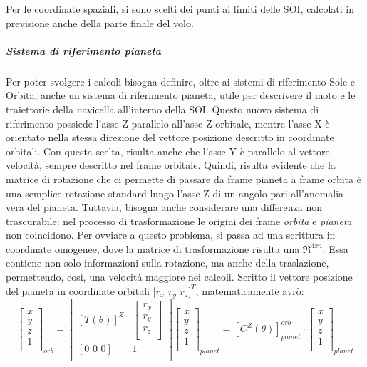\documentclass[a4paper]{article}
\begin{document}
Per le coordinate spaziali, si sono scelti dei punti ai limiti delle SOI, calcolati in previsione anche della parte finale del volo.
\newpage
\subparagraph{Sistema di riferimento pianeta\newline} Per poter svolgere i calcoli bisogna definire, oltre ai sistemi di riferimento Sole e Orbita, anche un sistema di riferimento pianeta, utile per descrivere il moto e le traiettorie della navicella all'interno della SOI. \newline Questo nuovo sistema di riferimento possiede l'asse Z parallelo all'asse Z orbitale, mentre l'asse X è orientato nella stessa direzione del vettore posizione descritto in coordinate orbitali. Con questa scelta, risulta anche che l'asse Y è parallelo al vettore velocità, sempre descritto nel frame orbitale. Quindi, risulta evidente che la matrice di rotazione che ci permette di passare da frame pianeta a frame orbita è una semplice rotazione standard lungo l'asse Z di un angolo pari all'anomalia vera del pianeta. Tuttavia, bisogna anche considerare una differenza non trascurabile: nel processo di trasformazione le origini dei frame \textit{orbita} e \textit{pianeta} non coincidono. Per ovviare a questo problema, si passa ad una scrittura in coordinate omogenee, dove la matrice di trasformazione risulta una $\Re^{4x4}$. Essa contiene non solo informazioni sulla rotazione, ma anche della traslazione, permettendo, così, una velocità maggiore nei calcoli. \newline Scritto il vettore posizione del pianeta in coordinate orbitali $[r_{x}$ $r_{y}$ $r_{z}]^{T}$, matematicamente avrò:
\[
\begin{bmatrix}
x \\
y \\
z \\
1 \\
\end{bmatrix}_{orb} = \begin{bmatrix}
[T(\theta)]^{Z} & \begin{bmatrix}
r_{x} \\
r_{y} \\
r_{z} \\
\end{bmatrix} \\
[\text{0  0  0}] & 1 \\
\end{bmatrix} \begin{bmatrix}
x \\
y \\
z \\
1 \\
\end{bmatrix}_{planet} = [C^{Z}(\theta)]_{planet}^{orb} \cdot \begin{bmatrix}
x \\
y \\
z \\
1 \\
\end{bmatrix}_{planet}
\]
\end{document}
